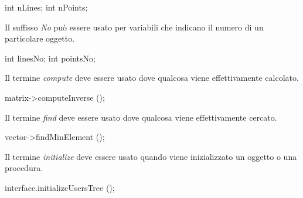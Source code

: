 \begin{minipage}[t]{\rbwidth}
\begin{RightCode}
int nLines;
int nPoints;
\end{RightCode}
\end{minipage}

Il suffisso \emph{No} può essere usato per variabili che indicano il numero di un particolare oggetto.

\begin{minipage}[t]{\rbwidth}
\begin{RightCode}
int linesNo;
int pointsNo;
\end{RightCode}
\end{minipage}

Il termine \emph{compute} deve essere usato dove qualcosa viene effettivamente calcolato.

\begin{minipage}[t]{\rbwidth}
\begin{RightCode}
matrix->computeInverse ();
\end{RightCode}
\end{minipage} 

Il termine \emph{find} deve essere usato dove qualcosa viene effettivamente cercato.

\begin{minipage}[t]{\rbwidth}
\begin{RightCode}
vector->findMinElement ();
\end{RightCode}
\end{minipage} 

Il termine \emph{initialize} deve essere usato quando viene inizializzato un oggetto o una procedura.

\begin{minipage}[t]{\rbwidth}
\begin{RightCode}
interface.initializeUsersTree ();
\end{RightCode}
\end{minipage}

